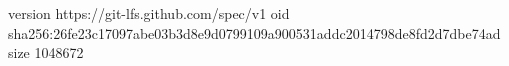 version https://git-lfs.github.com/spec/v1
oid sha256:26fe23c17097abe03b3d8e9d0799109a900531addc2014798de8fd2d7dbe74ad
size 1048672
